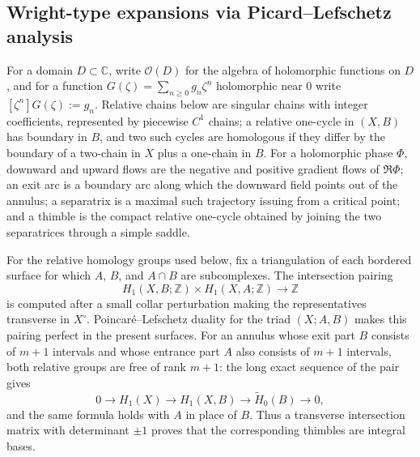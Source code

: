\documentclass[reqno]{article}
\theoremstyle{definition}
\theoremstyle{remark}
\theoremstyle{plain}
\newcommand{\C}{\mathbb C}
\begin{document}
\subsection{Wright-type expansions via Picard--Lefschetz analysis}
For a domain $D\subset\C$, write $\mathcal O(D)$ for the algebra of holomorphic functions on $D$, and for a function $G(\zeta)=\sum_{n\ge0}g_n\zeta^n$ holomorphic near $0$ write $[\zeta^n]G(\zeta):=g_n$. Relative chains below are singular chains with integer coefficients, represented by piecewise $C^1$ chains; a relative one-cycle in $(X,B)$ has boundary in $B$, and two such cycles are homologous if they differ by the boundary of a two-chain in $X$ plus a one-chain in $B$. For a holomorphic phase $\Phi$, downward and upward flows are the negative and positive gradient flows of $\Re\Phi$; an exit arc is a boundary arc along which the downward field points out of the annulus; a separatrix is a maximal such trajectory issuing from a critical point; and a thimble is the compact relative one-cycle obtained by joining the two separatrices through a simple saddle.

For the relative homology groups used below, fix a triangulation of each bordered surface for which $A$, $B$, and $A\cap B$ are subcomplexes. The intersection pairing
\[
H_1(X,B;\mathbb Z)\times H_1(X,A;\mathbb Z)\longrightarrow\mathbb Z
\]
is computed after a small collar perturbation making the representatives transverse in $X^\circ$. Poincar\'e--Lefschetz duality for the triad $(X;A,B)$ makes this pairing perfect in the present surfaces. For an annulus whose exit part $B$ consists of $m+1$ intervals and whose entrance part $A$ also consists of $m+1$ intervals, both relative groups are free of rank $m+1$: the long exact sequence of the pair gives
\[
0\to H_1(X)\to H_1(X,B)\to \widetilde H_0(B)\to0,
\]
and the same formula holds with $A$ in place of $B$. Thus a transverse intersection matrix with determinant $\pm1$ proves that the corresponding thimbles are integral bases.
\end{document}
